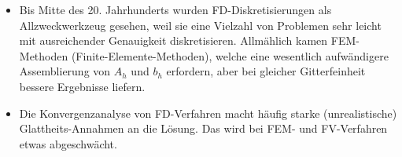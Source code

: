 \begin{note}
	\begin{itemize}
		\item
			Bis Mitte des 20. Jahrhunderts wurden FD-Diskretisierungen als Allzweckwerkzeug gesehen, weil sie eine Vielzahl von Problemen sehr leicht mit ausreichender Genauigkeit diskretisieren.
			Allmählich kamen FEM-Methoden (Finite-Elemente-Methoden), welche eine wesentlich aufwändigere Assemblierung von $A_h$ und $b_h$ erfordern, aber bei gleicher Gitterfeinheit bessere Ergebnisse liefern.
		\item
			Die Konvergenzanalyse von FD-Verfahren macht häufig starke (unrealistische) Glattheits-Annahmen an die Lösung.
			Das wird bei FEM- und FV-Verfahren etwas abgeschwächt.
	\end{itemize}
\end{note}
